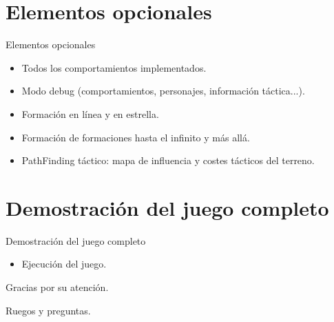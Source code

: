 \documentclass[10pt]{beamer}
\begin{document}
\section{Elementos opcionales}
\begin{frame}{Elementos opcionales}
\begin{itemize}[<+- | alert@+>]
	\item Todos los comportamientos implementados.
	\item Modo debug (comportamientos, personajes, información táctica...).
	\item Formación en línea y en estrella.
	\item Formación de formaciones hasta el infinito y más allá.
	\item PathFinding táctico: mapa de influencia y costes tácticos del terreno.
\end{itemize}
\end{frame}

\section{Demostración del juego completo}
\begin{frame}{Demostración del juego completo}
\begin{itemize}[<+- | alert@+>]
	\item Ejecución del juego.
\end{itemize}
\end{frame}

\begin{frame}[standout]
  Gracias por su atención.
\end{frame}


\begin{frame}[standout]
  Ruegos y preguntas.
\end{frame}
\end{document}
